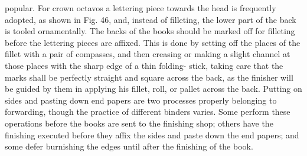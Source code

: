 \documentclass[twoside]{book}
\begin{document}
popular. For crown octavos a lettering piece towards
the head is frequently adopted, as shown in
Fig. 46, and, instead of filleting, the lower part
of the back is tooled ornamentally. The backs of the
books should be marked off for filleting before the
lettering pieces are affixed. This is done by setting
off the places of the fillet with a pair of compasses,
and then creasing or making a slight channel
at those places with the sharp edge of a thin folding-
stick, taking care that the marks shall be perfectly
straight and square across the back, as the finisher
will be guided by them in applying his fillet, roll, or
pallet across the back.
\pagebreak
Putting on sides and pasting down end papers
are two processes properly belonging to forwarding,
though the practice of different binders varies.
Some perform these operations before the books
are sent to the finishing shop; others have the
finishing executed before they affix the sides and
paste down the end papers; and some defer burnishing
the edges until after the finishing of the book.
\end{document}
